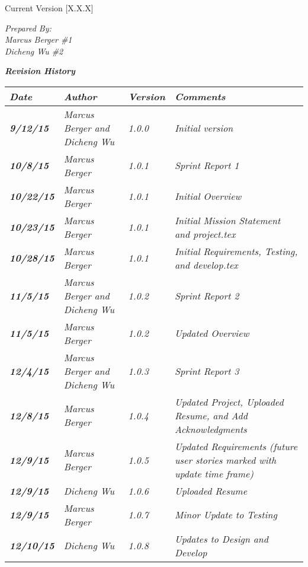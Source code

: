 


Current Version [X.X.X]
\vspace*{5mm}

{\color{SDColor5}
\noindent
\textit{Prepared By:}\\
\textit{Marcus Berger \#1}\\
\textit{Dicheng Wu \#2}\\
}

\vfill
\noindent
{\color{SDColor3} \textit{\textbf{Revision History}}}\\
\begin{tabular}{|>{\raggedright}p{1.5cm}|>{\raggedright}p{3cm}|>{\raggedright}p{1.5cm}|>{\raggedright}p{9cm}|}
\hline
\textit{\textbf{Date}} &  \textit{\textbf{Author}} & \textit{\textbf{Version}} & \textit{\textbf{Comments}}\tabularnewline
\hline
 \textit{\textbf{9/12/15}} & \textit{Marcus Berger and Dicheng Wu} & \textit{1.0.0} & \textit{Initial version}\tabularnewline
\hline
\textit{\textbf{10/8/15}} & \textit{Marcus Berger} & \textit{1.0.1} & \textit{Sprint Report 1}\tabularnewline
\hline
\textit{\textbf{10/22/15}} & \textit{Marcus Berger} & \textit{1.0.1} & \textit{Initial Overview}\tabularnewline
\hline
\textit{\textbf{10/23/15}} & \textit{Marcus Berger} & \textit{1.0.1} & \textit{Initial Mission Statement and project.tex}\tabularnewline
\hline
\textit{\textbf{10/28/15}} & \textit{Marcus Berger} & \textit{1.0.1} & \textit{Initial Requirements, Testing, and develop.tex }\tabularnewline
\hline
\textit{\textbf{11/5/15}} & \textit{Marcus Berger and Dicheng Wu} & \textit{1.0.2} & \textit{Sprint Report 2}\tabularnewline
\hline
\textit{\textbf{11/5/15}} & \textit{Marcus Berger} & \textit{1.0.2} & \textit{Updated Overview}\tabularnewline
\hline
\textit{\textbf{12/4/15}} & \textit{Marcus Berger and Dicheng Wu} & \textit{1.0.3} & \textit{Sprint Report 3}\tabularnewline
\hline
\textit{\textbf{12/8/15}} & \textit{Marcus Berger} & \textit{1.0.4} & \textit{Updated Project, Uploaded Resume, and Add Acknowledgments}\tabularnewline
\hline
\textit{\textbf{12/9/15}} & \textit{Marcus Berger} & \textit{1.0.5} & \textit{Updated Requirements (future user stories marked with update time frame) }\tabularnewline
\hline
\textit{\textbf{12/9/15}} & \textit{Dicheng Wu} & \textit{1.0.6} & \textit{Uploaded Resume}\tabularnewline
\hline
\textit{\textbf{12/9/15}} & \textit{Marcus Berger} & \textit{1.0.7} & \textit{Minor Update to Testing}\tabularnewline
\hline
\textit{\textbf{12/10/15}} & \textit{Dicheng Wu} & \textit{1.0.8} & \textit{Updates to Design and Develop}\tabularnewline

\end{tabular}
